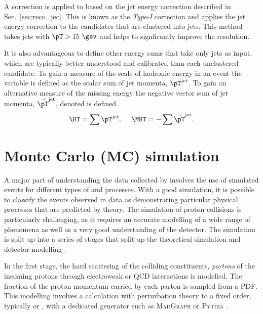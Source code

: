 A correction is applied to \met based on the jet energy correction
described in Sec.~\ref{sec:reco_jec}. This is known as the \emph{Type-I}
correction and applies the jet energy correction to the \PF candidates that are
clustered into jets. This method takes jets with $\pT>15~\gev$ and
helps to signficantly improve the \met resolution.

It is also advantageous to define other energy sums that take only
jets as input, which are typically better understood and calibrated
than each unclustered \PF candidate. To gain a measure of the scale of
hadronic energy in an event the \HT variable is defined as the scalar
sum of jet momenta, $\pT^{\textrm{jet}}$. To gain an alternative
measure of the missing energy the negative vector sum of jet momenta,
$\vec{\pT}^{\textrm{jet}}$, denoted  \MHT is defined.
\begin{equation}
\HT = \sum{\pT^{\textrm{jet}}},~~~~\MHT =
-\sum{\vec{\pT}^{\textrm{jet}}}.
\end{equation}

\section{Monte Carlo (MC) simulation}
\label{sec:mc_reco}

A major part of understanding the data collected by \CMS involves the
use of simulated events for different types of \SM and \BSM processes.
With a good simulation, it is possible to classify the events observed
in data as demonstrating particular physical processes that are
predicted by theory. The simulation of proton collisions is
particularly challenging, as it requires an accurate modelling of a
wide range of \SM phenomena as well as a very good understanding of
the \CMS detector. The simulation is split up into a series of
stages that split up the theoretical simulation and detector modelling
\cite{Buckley:2011ms}. 

In the first stage, the hard scattering of the colliding constituents,
\emph{partons} of the incoming protons through electroweak or QCD
interactions is modelled. The fraction of the proton momentum carried
by each parton is sampled from a \ac{PDF}. This modelling involves a
calculation with perturbation theory to a fixed order, typically \LO
or \NLO, with a dedicated \MC generator such as \textsc{MadGraph}
\cite{Alwall:2011uj} or \textsc{Pythia} \cite{Sjostrand:2007gs}.

